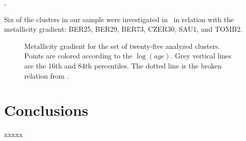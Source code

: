 \documentclass{aa}
\begin{document}
  \cite{Donor_2020}, 

  Six of the clusters in our sample were investigated in~\cite{Netopil_2021} in
  relation with the metallicity gradient: BER25, BER29, BER73, CZER30, SAU1,
  and TOMB2.


  \begin{figure}
   \caption{Metallicity gradient for the set of twenty-five analyzed clusters.
   Points are colored according to the $\log(age)$. Grey vertical lines are the
   16th and 84th percentiles. The dotted line is the broken relation from 
   \citet[][Fig 7]{Donor_2020}.}
   \label{fig:met_gradient}
  \end{figure}






\section{Conclusions}
 \label{sec:conclusions}

 xxxxx




\end{document}
